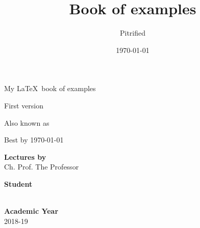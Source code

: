 
\title{Book of examples}
\author{Pitrified}
\date{\today}

\makeatletter
\begin{titlepage}
	
	\begin{center}
		\vspace*{1cm}

		{\Large My \LaTeX\ book of examples }
		\vspace*{0.75cm}

		{\Large First version}
		\vspace*{0.75cm}

        {\small Also known as}
		\vspace*{0.75cm}

		{\LARGE\bfseries \@title} %
		\vspace*{0.75cm}

        {\small Best by \today }

    \end{center}
	
	\vfill 

	\noindent\textbf{Lectures by}\\
	Ch. Prof. The Professor

	\vspace*{0.25cm}

	\noindent\textbf{Student}\\
    \@author\\%

	\vspace*{0.25cm}

	\noindent\textbf{Academic Year}\\
	2018-19

\end{titlepage}
\makeatother

